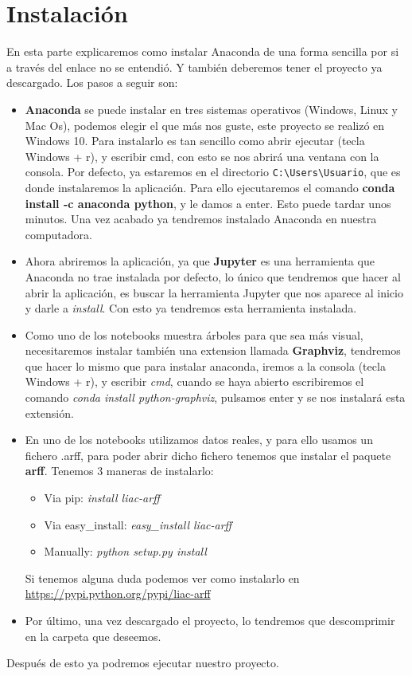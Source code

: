 \section{Instalación}
En esta parte explicaremos como instalar Anaconda de una forma sencilla por si a través del enlace no se entendió. Y también deberemos tener el proyecto ya descargado. Los pasos a seguir son:
\begin{itemize}
	\item \textbf{Anaconda} se puede instalar en tres sistemas operativos (Windows, Linux y Mac Os), podemos elegir el que más nos guste, este proyecto se realizó en Windows 10. Para instalarlo es tan sencillo como abrir ejecutar (tecla Windows + r), y escribir cmd, con esto se nos abrirá una ventana con la consola. Por defecto, ya estaremos en el directorio \texttt{C:\textbackslash Users\textbackslash Usuario}, que es donde instalaremos la aplicación. Para ello ejecutaremos el comando \textbf{conda install -c anaconda python}, y le damos a enter. Esto puede tardar unos minutos. Una vez acabado ya tendremos instalado Anaconda en nuestra computadora.
	\item Ahora abriremos la aplicación, ya que \textbf{Jupyter} es una herramienta que Anaconda no trae instalada por defecto, lo único que tendremos que hacer al abrir la aplicación, es buscar la herramienta Jupyter que nos aparece al inicio y darle a \textit{install}. Con esto ya tendremos esta herramienta instalada.
	\item Como uno de los notebooks muestra árboles para que sea más visual, necesitaremos instalar también una extension llamada \textbf{Graphviz}, tendremos que hacer lo mismo que para instalar anaconda, iremos a la consola (tecla Windows + r), y escribir \textit{cmd}, cuando se haya abierto escribiremos el comando \textit{conda install python-graphviz}, pulsamos enter y se nos instalará esta extensión.
	\item En uno de los notebooks utilizamos datos reales, y para ello usamos un fichero .arff, para poder abrir dicho fichero tenemos que instalar el paquete \textbf{arff}. Tenemos 3 maneras de instalarlo:
	\begin{itemize}
		\item Via pip: \textit{install liac-arff}
		\item Via easy\_install: \textit{easy\_install liac-arff}
		\item Manually: \textit{python setup.py install}
	\end{itemize}
	Si tenemos alguna duda podemos ver como instalarlo en \url{https://pypi.python.org/pypi/liac-arff}
	\item Por último, una vez descargado el proyecto, lo tendremos que descomprimir en la carpeta que deseemos.
\end{itemize}
Después de esto ya podremos ejecutar nuestro proyecto.


